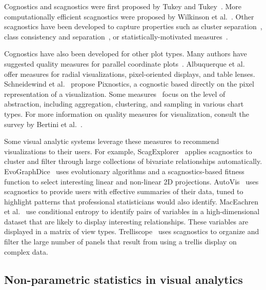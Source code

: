 Cognostics and scagnostics were first proposed by Tukey and Tukey~\cite{Tukey1982, Tukey1985}. More computationally efficient scagnostics were proposed by Wilkinson et al.~\cite{Wilkinson2005, Wilkinson2008}. Other scagnostics have been developed to capture properties such as cluster separation~\cite{Sedlmair2012, Tatu2009}, class consistency and separation~\cite{Sips2009, Schafer2013}, or statistically-motivated measures~\cite{Kandel2012, Seo2005, Piringer2008}.

Cognostics have also been developed for other plot types. Many authors have suggested quality measures for parallel coordinate plots~\cite{Ankerst1998, Dasgupta2010, Johansson2009, Yang2003}. Albuquerque et al.~\cite{Albuquerque2010} offer  measures for radial visualizations, pixel-oriented displays, and table lenses. Schneidewind et al.~\cite{Schneidewind2006} propose Pixnostics, a cognostic based directly on the pixel representation of a visualization. Some measures~\cite{Bertini2006, Cui2006, Yang2003} focus on the level of abstraction, including aggregation, clustering, and sampling in various chart types. For more information on quality measures for visualization, consult the survey by Bertini et al.~\cite{Bertini2011}. 

Some visual analytic systems leverage these measures to recommend visualizations to their users. For example, ScagExplorer~\cite{Dang2014} applies scagnostics to cluster and filter through large collections of bivariate relationships automatically.
EvoGraphDice~\cite{Boukhelifa2013} uses evolutionary algorithms and a scagnostics-based fitness function to select interesting linear and non-linear 2D projections.
AutoVis~\cite{Wills2010} uses scagnostics to provide users with effective summaries of their data, tuned to highlight patterns that professional statisticians would also identify.
MacEachren et al.~\cite{Maceachren2003} use conditional entropy to identify pairs of variables in a high-dimensional dataset that are likely to display interesting relationships. These variables are displayed in a matrix of view types. Trelliscope~\cite{Hafen2013} uses scagnostics to organize and filter the large number of panels that result from using a trellis display on complex data.



\subsection{Non-parametric statistics in visual analytics}

